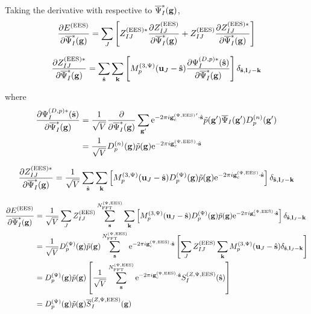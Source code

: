 \documentclass[paper=a4, fontsize=11pt]{article} %
\numberwithin{equation}{section} %
\numberwithin{figure}{section} %
\numberwithin{table}{section} %
\newcommand{\p}{\partial}
\newcommand{\ol}{\overline}
\newcommand{\bu}{{\bf{u}}}
\newcommand{\bl}{{\bf{l}}}
\newcommand{\bk}{{\bf{k}}}
\newcommand{\bs}{{\bf{s}}}
\newcommand{\bg}{{\bf{g}}}
\newcommand{\rEES}{{\mathrm{EES}}}
\newcommand{\re}{{\mathrm{e}}}
\newcommand{\gcpEES}{{\bg_c^{(\Psi,\rEES)}}}
\newcommand{\sigsc}{{\overline \Psi_I^{*}(\bg)}}
\newcommand{\NFFTpEES}{{N^{\mathrm{(\Psi,\rEES})}_{\mathrm{FFT}}}}
\newcommand{\Dng}{{D^{(n)}_p(\bg)}}
\newcommand{\Dpg}{{D^{(\Psi)}_p(\bg)}}
\newcommand{\Mp}{{M_p^{(3,\Psi)}}}
\begin{document}
Taking the derivative with respective to $\ol \Psi^*_I(\bg)$,
\begin{equation}
\begin{split}
\frac{\p E^{(\rEES)}}{\p \sigsc} = \sum_J\left[ Z_{IJ}^{(\rEES)*} \frac{\p Z_{IJ}^{(\rEES)}}{\p \sigsc} + Z_{IJ} ^{(\rEES)}\frac{\p Z^{(\rEES)*}_{IJ}}{\p \sigsc}\right]
\end{split}
\end{equation}

\begin{equation}
\frac{\p Z^{(\rEES)*}_{IJ}}{\p \sigsc} = \sum_{\hat \bs} \sum_{\bk} \left[\Mp(\bu_{J}-\hat \bs) \frac{\p \Psi_I^{(D,p)*}(\hat \bs)}{\p \sigsc}\right] \delta_{\hat \bs,\bl_J-\bk} 
\end{equation}

where
\begin{equation}\begin{split}
\frac{\p  \Psi_I^{(D,p)*}(\hat \bs)}{\p \sigsc}
&=  \frac{1}{\sqrt{V}}\frac{\p} {\p \sigsc}\sum_{\bg'} \re^{-2\pi i\gcpEES' \cdot \hat\bs} \tilde p (\bg') \ol \Psi_I(\bg') D^{(n)}_p(\bg') \\
&= \frac{1}{\sqrt{V}}\Dng\tilde p(\bg)\re^{-2\pi i\gcpEES \cdot \hat\bs}
\end{split}\end{equation}

\begin{equation}\label{eq:masterdpsi}
\frac{\p Z^{(\rEES)*}_{IJ}}{\p \sigsc} = \frac{1}{\sqrt{V}}\sum_{\hat \bs} \sum_{\bk} \left[\Mp(\bu_{J}-\hat \bs) \Dpg\tilde p(\bg)\re^{-2\pi i\gcpEES \cdot \hat\bs}\right] \delta_{\hat \bs,\bl_J-\bk}
\end{equation}

\begin{equation}\label{eq:dEdps3}
\begin{split}
\frac{\p E^{(\rEES)}}{\p \sigsc}
&= \frac{1}{\sqrt{V}} \sum_J Z_{IJ} ^{(\rEES)} \sum_{\bs}^\NFFTpEES \sum_{\bk} \left[\Mp(\bu_{J}-\hat \bs) \Dpg\tilde p(\bg)\re^{-2\pi i\gcpEES \cdot \hat\bs}\right] \delta_{\hat \bs,\bl_J-\bk} \\
&= \frac{1}{\sqrt{V}} \Dpg\tilde p(\bg) \sum_{\bs}^\NFFTpEES \re^{-2\pi i\gcpEES \cdot \hat\bs} \left[\sum_J Z_{IJ} ^{(\rEES)} \sum_{\bk} \Mp(\bu_{J}-\hat \bs) \delta_{\hat \bs,\bl_J-\bk}\right] \\
&=  \Dpg\tilde p(\bg) \left[\frac{1}{\sqrt{V}}\sum_{\bs}^\NFFTpEES \re^{-2\pi i\gcpEES \cdot \hat\bs} S^{(Z,\Psi,\rEES)}_I(\hat \bs) \right] \\
&= \Dpg\tilde p(\bg) \ol S^{(Z,\Psi,\rEES)}_I(\bg)
\end{split}
\end{equation}
\end{document}

